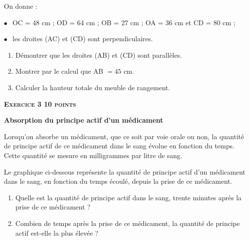 \documentclass[11pt]{article}
\begin{document}
On donne :

$\bullet~~$ OC = 48 cm ; OD = 64 cm ; OB = 27 cm ; OA = 36 cm et CD = 80 cm ;

$\bullet~~$ les droites (AC) et (CD) sont perpendiculaires.

\begin{enumerate}
\item Démontrer que les droites (AB) et (CD) sont parallèles.
\item Montrer par le calcul que AB $= 45$ cm.
\item Calculer la hauteur totale du meuble de rangement.
\end{enumerate}

\newpage

\textbf{\textsc{Exercice 3 \hfill 10 points}}

\textbf{Absorption du principe actif d'un médicament}

Lorsqu'on absorbe un médicament, que ce soit par voie orale ou non, la quantité de principe actif de ce médicament dans le sang évolue en fonction du temps. Cette quantité se mesure en milligrammes par litre de sang.

Le graphique ci-dessous représente la quantité de principe actif d'un médicament dans le sang, en fonction du temps écoulé, depuis la prise de ce médicament.

\begin{center}
\end{center}
\begin{enumerate}
\item  Quelle est la quantité de principe actif dans le sang, trente minutes après la prise de ce médicament ?
  
\item Combien de temps après la prise de ce médicament, la quantité de principe actif est-elle la plus élevée ?
\end{enumerate}
\end{document}
